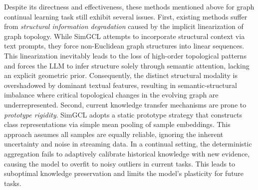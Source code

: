 \documentclass[sigconf]{acmart}
\begin{document}

Despite its directness and effectiveness, these methods mentioned above for graph continual learning task still exhibit several issues. 
First, existing methods suffer from \textit{structural information degradation} caused by the implicit linearization of graph topology. 
While SimGCL attempts to incorporate structural context via text prompts, they force non-Euclidean graph structures into linear sequences.
This linearization inevitably leads to the loss of high-order topological patterns and forces the LLM to infer structure solely through semantic attention, lacking an explicit geometric prior. 
Consequently, the distinct structural modality is overshadowed by dominant textual features, resulting in semantic-structural imbalance where critical topological changes in the evolving graph are underrepresented.
Second, current knowledge transfer mechanisms are prone to \textit{prototype rigidity}. 
SimGCL adopts a static prototype strategy that constructs class representations via simple mean pooling of sample embeddings. 
This approach assumes all samples are equally reliable, ignoring the inherent uncertainty and noise in streaming data.
In a continual setting, the deterministic aggregation fails to adaptively calibrate historical knowledge with new evidence, causing the model to overfit to noisy outliers in current tasks. 
This leads to suboptimal knowledge preservation and limits the model's plasticity for future tasks.
\end{document}
